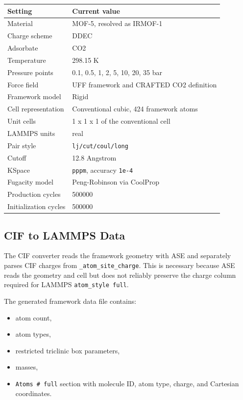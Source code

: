 \begin{longtable}{p{}p{}}
\toprule
\textbf{Setting} & \textbf{Current value} \\
\midrule
Material & MOF-5, resolved as IRMOF-1 \\
Charge scheme & DDEC \\
Adsorbate & CO2 \\
Temperature & 298.15 K \\
Pressure points & 0.1, 0.5, 1, 2, 5, 10, 20, 35 bar \\
Force field & UFF framework and CRAFTED CO2 definition \\
Framework model & Rigid \\
Cell representation & Conventional cubic, 424 framework atoms \\
Unit cells & 1 x 1 x 1 of the conventional cell \\
LAMMPS units & real \\
Pair style & \texttt{lj/cut/coul/long} \\
Cutoff & 12.8 Angstrom \\
KSpace & \texttt{pppm}, accuracy \texttt{1e-4} \\
Fugacity model & Peng-Robinson via CoolProp \\
Production cycles & 500000 \\
Initialization cycles & 500000 \\
\bottomrule
\end{longtable}

\subsection{CIF to LAMMPS Data}

The CIF converter reads the framework geometry with ASE and separately parses CIF charges from \texttt{\_atom\_site\_charge}.
This is necessary because ASE reads the geometry and cell but does not reliably preserve the charge column required for LAMMPS \texttt{atom\_style full}.

The generated framework data file contains:

\begin{itemize}
    \item atom count,
    \item atom types,
    \item restricted triclinic box parameters,
    \item masses,
    \item \texttt{Atoms \# full} section with molecule ID, atom type, charge, and Cartesian coordinates.
\end{itemize}

